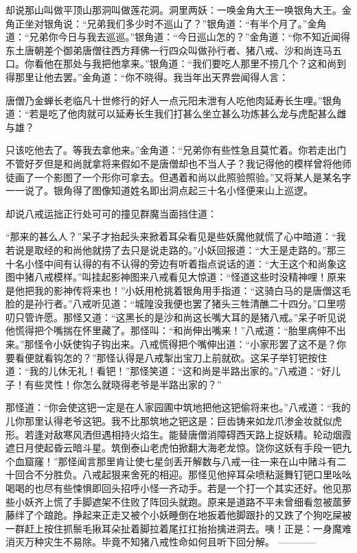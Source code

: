 \documentclass[12pt,UTF8]{ctexbook}
\begin{document}
却说那山叫做平顶山那洞叫做莲花洞。洞里两妖：一唤金角大王一唤银角大王。金角正坐对银角说：“兄弟我们多少时不巡山了？”银角道：“有半个月了。”金角道：“兄弟你今日与我去巡巡。”银角道：“今日巡山怎的？”金角道：“你不知近闻得东土唐朝差个御弟唐僧往西方拜佛一行四众叫做孙行者、猪八戒、沙和尚连马五口。你看他在那处与我把他拿来。”银角道：“我们要吃人那里不捞几个？这和尚到得那里让他去罢。”金角道：“你不晓得。我当年出天界尝闻得人言：

唐僧乃金蝉长老临凡十世修行的好人一点元阳未泄有人吃他肉延寿长生哩。”银角道：“若是吃了他肉就可以延寿长生我们打甚么坐立甚么功炼甚么龙与虎配甚么雌与雄？

只该吃他去了。等我去拿他来。”金角道：“兄弟你有些性急且莫忙着。你若走出门不管好歹但是和尚就拿将来假如不是唐僧却也不当人子？我记得他的模样曾将他师徒画了一个影图了一个形你可拿去。但遇着和尚以此照验照验。”又将某人是某名字一一说了。银角得了图像知道姓名即出洞点起三十名小怪便来山上巡逻。

却说八戒运拙正行处可可的撞见群魔当面挡住道：

“那来的甚么人？”呆子才抬起头来掀着耳朵看见是些妖魔他就慌了心中暗道：“我若说是取经的和尚他就捞了去只是说走路的。”小妖回报道：“大王是走路的。”那三十名小怪中间有认得的有不认得的旁边有听着指点说话的道：“大王这个和尚象这图中猪八戒模样。”叫挂起影神图来八戒看见大惊道：“怪道这些时没精神哩！原来是他把我的影神传将来也！”小妖用枪挑着银角用手指道：“这骑白马的是唐僧这毛脸的是孙行者。”八戒听见道：“城隍没我便也罢了猪头三牲清醮二十四分。”口里唠叨只管许愿。那怪又道：“这黑长的是沙和尚这长嘴大耳的是猪八戒。”呆子听见说他慌得把个嘴揣在怀里藏了。那怪叫：“和尚伸出嘴来！”八戒道：“胎里病伸不出来。”那怪令小妖使钩子钩出来。八戒慌得把个嘴伸出道：“小家形罢了这不是？你要看便就看钩怎的？”那怪认得是八戒掣出宝刀上前就砍。这呆子举钉钯按住道：“我的儿休无礼！看钯！”那怪笑道：“这和尚是半路出家的。”八戒道：“好儿子！有些灵性！你怎么就晓得老爷是半路出家的？”

那怪道：“你会使这钯一定是在人家园圃中筑地把他这钯偷将来也。”八戒道：“我的儿你那里认得老爷这钯。我不比那筑地之钯这是：巨齿铸来如龙爪渗金妆就似虎形。若逢对敌寒风洒但遇相持火焰生。能替唐僧消障碍西天路上捉妖精。轮动烟霞遮日月使起昏云暗斗星。筑倒泰山老虎怕掀翻大海老龙惊。饶你这妖有手段一钯九个血窟窿！”那怪闻言那里肯让使七星剑丢开解数与八戒一往一来在山中赌斗有二十回合不分胜负。八戒起狠来舍死的相迎。那怪见他捽耳朵喷粘涎舞钉钯口里吆吆喝喝的也尽有些悚惧即回头招呼小怪一齐动手。若是一个打一个其实还好。他见那些小妖齐上慌了手脚遮架不住败了阵回头就跑。原来是道路不平未曾细看忽被蓏萝藤绊了个踉跄。挣起来正走又被个小妖睡倒在地扳着他脚跟扑的又跌了个狗吃屎被一群赶上按住抓鬃毛揪耳朵扯着脚拉着尾扛扛抬抬擒进洞去。咦！正是：一身魔难消灭万种灾生不易除。毕竟不知猪八戒性命如何且听下回分解。
------------
\end{document}
